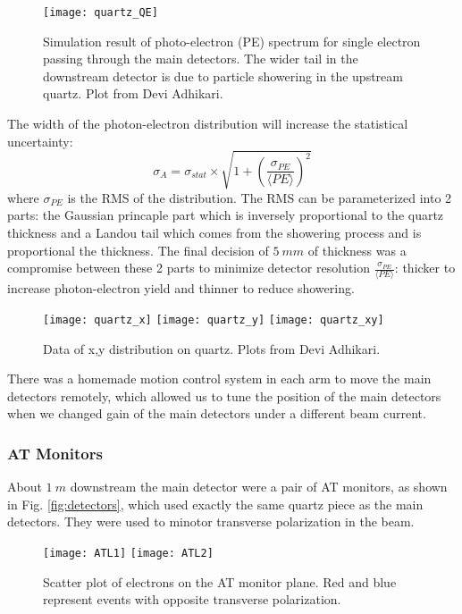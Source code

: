 \begin{figure}
    \centering
    \texttt{[image: quartz\_QE]}
    \caption{Simulation result of photo-electron (PE) spectrum for single electron
    passing through the main detectors. The wider tail in the downstream
    detector is due to particle showering in the upstream quartz.
    Plot from Devi Adhikari.}
\end{figure}
The width of the photon-electron distribution will increase
the statistical uncertainty:
\begin{equation}
    \sigma_{A} = \sigma_{stat} \times \sqrt{1 + \left( \frac{\sigma_{PE}}{\langle PE \rangle }\right)^2}
\end{equation}
where $\sigma_{PE}$ is the RMS of the distribution. The RMS can be parameterized
into 2 parts: the Gaussian princaple part which is inversely proportional to
the quartz thickness and a Landou tail which comes from the showering process
and is proportional the thickness. The final decision of $5\ mm$ of thickness
was a compromise between these 2 parts to minimize detector resolution 
$\frac{\sigma_{PE}}{\langle PE \rangle}$: thicker to increase photon-electron
yield and thinner to reduce showering.

\begin{figure}
    \centering
    \texttt{[image: quartz\_x]}
    \texttt{[image: quartz\_y]}
    \texttt{[image: quartz\_xy]}
    \caption{Data of x,y distribution on quartz. Plots from Devi Adhikari.}
\end{figure}

There was a homemade motion control system in each arm to move the main detectors
remotely, which allowed us to tune the position of the main detectors when we
changed gain of the main detectors under a different beam current.


\subsubsection{AT Monitors}
About $1\ m$ downstream the main detector were a pair of AT monitors, as shown 
in Fig. \ref{fig:detectors}, which used exactly the same quartz piece as the 
main detectors. They were used to minotor transverse polarization in the beam.
\begin{figure}[h!]
    \centering
    \texttt{[image: ATL1]}
    \texttt{[image: ATL2]}
    \caption{Scatter plot of electrons on the AT monitor plane. Red and blue represent
    events with opposite transverse polarization. 
    }
\end{figure}

